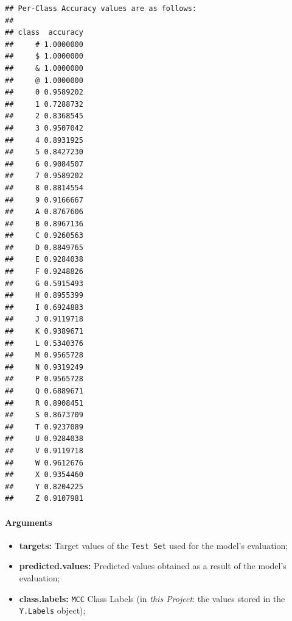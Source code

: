\documentclass[
]{report}
\providecommand{\tightlist}{%
  \setlength{\itemsep}{0pt}\setlength{\parskip}{0pt}}
\begin{document}
\begin{verbatim}
## Per-Class Accuracy values are as follows:
##      
## class  accuracy
##     # 1.0000000
##     $ 1.0000000
##     & 1.0000000
##     @ 1.0000000
##     0 0.9589202
##     1 0.7288732
##     2 0.8368545
##     3 0.9507042
##     4 0.8931925
##     5 0.8427230
##     6 0.9084507
##     7 0.9589202
##     8 0.8814554
##     9 0.9166667
##     A 0.8767606
##     B 0.8967136
##     C 0.9260563
##     D 0.8849765
##     E 0.9284038
##     F 0.9248826
##     G 0.5915493
##     H 0.8955399
##     I 0.6924883
##     J 0.9119718
##     K 0.9389671
##     L 0.5340376
##     M 0.9565728
##     N 0.9319249
##     P 0.9565728
##     Q 0.6889671
##     R 0.8908451
##     S 0.8673709
##     T 0.9237089
##     U 0.9284038
##     V 0.9119718
##     W 0.9612676
##     X 0.9354460
##     Y 0.8204225
##     Z 0.9107981
\end{verbatim}

\normalsize

\newpage

\protect{}\label{func.MCClassifier.accuracy.by_class.args}
\paragraph{Arguments}\label{arguments-5}

\hfill\break

\protect{}\label{func.MCClassifier.accuracy.by_class.args.targets}
\begin{itemize}
\tightlist
\item
  \textbf{targets:} Target values of the \texttt{Test\ Set} used for the model's evaluation;
\end{itemize}

\protect{}\label{func.MCClassifier.accuracy.by_class.args.predicted.values}
\begin{itemize}
\tightlist
\item
  \textbf{predicted.values:} Predicted values obtained as a result of the model's evaluation;
\end{itemize}

\protect{}\label{func.MCClassifier.accuracy.by_class.args.class.labels}
\begin{itemize}
\tightlist
\item
  \textbf{class.labels:} \texttt{MCC} Class Labels (in \emph{this Project}: the values stored in the \texttt{Y.Labels} object);
\end{itemize}
\end{document}
